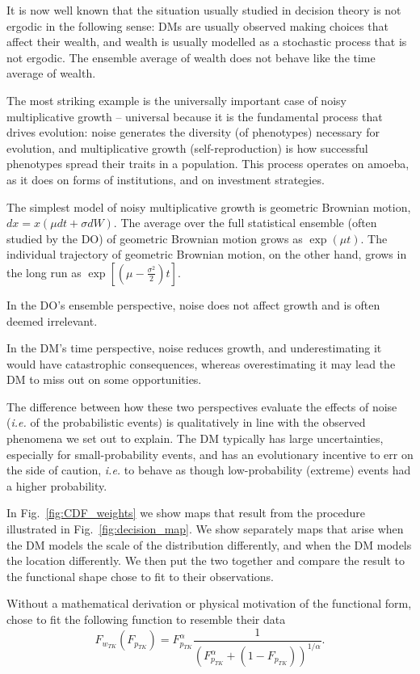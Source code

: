 \documentclass[11pt]{article}
\newcommand{\elabel}[1]{\label{eq:#1}}
\newcommand{\ie}{{\it i.e.}\xspace}
\newcommand{\fref}[1]{Fig.~\ref{fig:#1}}
\newcommand{\be}{\begin{equation}}
\newcommand{\ee}{\end{equation}}
\numberwithin{equation}{section}
\begin{document}
It is now well known that the situation usually studied in decision theory is not ergodic in the following sense: DMs are usually observed making choices that affect their wealth, and wealth is usually modelled as a stochastic process that is not ergodic. The ensemble average of wealth does not behave like the time average of wealth.

The most striking example is the universally important case of noisy multiplicative growth -- universal because it is the fundamental process that drives evolution: noise generates the diversity (of phenotypes) necessary for evolution, and multiplicative growth (self-reproduction) is how successful phenotypes spread their traits in a population. This process operates on amoeba, as it does on forms of institutions, and on investment strategies. 

The simplest model of noisy multiplicative growth is geometric Brownian motion, $dx=x(\mu dt+\sigma dW)$. The average over the full statistical ensemble (often studied by the DO) of geometric Brownian motion grows as $\exp(\mu t)$. The individual trajectory of geometric Brownian motion, on the other hand, grows in the long run as $\exp[(\mu-\frac{\sigma^2}{2})t]$.

In the DO's ensemble perspective, noise does not affect growth and is often deemed irrelevant.

In the DM's time perspective, noise reduces growth, and underestimating it would have catastrophic consequences, whereas overestimating it may lead the DM to miss out on some opportunities.

The difference between how these two perspectives evaluate the effects of noise (\ie of the probabilistic events) is qualitatively in line with the observed phenomena we set out to explain. The DM typically has large uncertainties, especially for small-probability events, and has an evolutionary incentive to err on the side of caution, \ie to behave as though low-probability (extreme) events had a higher probability.

In \fref{CDF_weights} we show maps that result from the procedure illustrated in \fref{decision_map}. We show separately maps that arise when the DM models the scale of the distribution differently, and when the DM models the location differently. We then put the two together and compare the result to the functional shape \citet{TverskyKahneman1992} chose to fit to their observations.

Without a mathematical derivation or physical motivation of the functional form, \citet{TverskyKahneman1992} chose to fit the following function to resemble their data
\be
F_{w_{TK}}(F_{p_{TK}})=F_{p_{TK}}^\alpha \frac{1}{(F_{p_{TK}}^\alpha+(1-F_{p_{TK}}))^{1/\alpha}}.
\elabel{correspondence}
\ee
\end{document}
